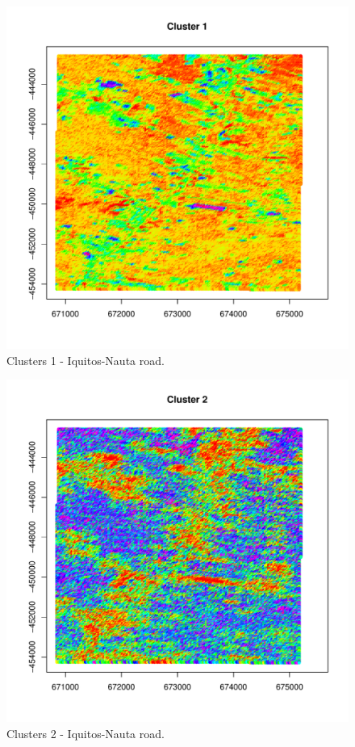 \documentclass[article]{jss}
\begin{document}
\begin{figure}
    \includegraphics[width=\linewidth, height=0.85\textheight]{plot0021.pdf}
    \caption{Clusters 1 - Iquitos-Nauta road.}
    \label{figure:cluster1}
\end{figure}

\begin{figure}
    \includegraphics[width=\linewidth, height=0.85\textheight]{plot0022.pdf}
    \caption{Clusters 2 - Iquitos-Nauta road.}
    \label{figure:cluster2}
\end{figure}
\end{document}
